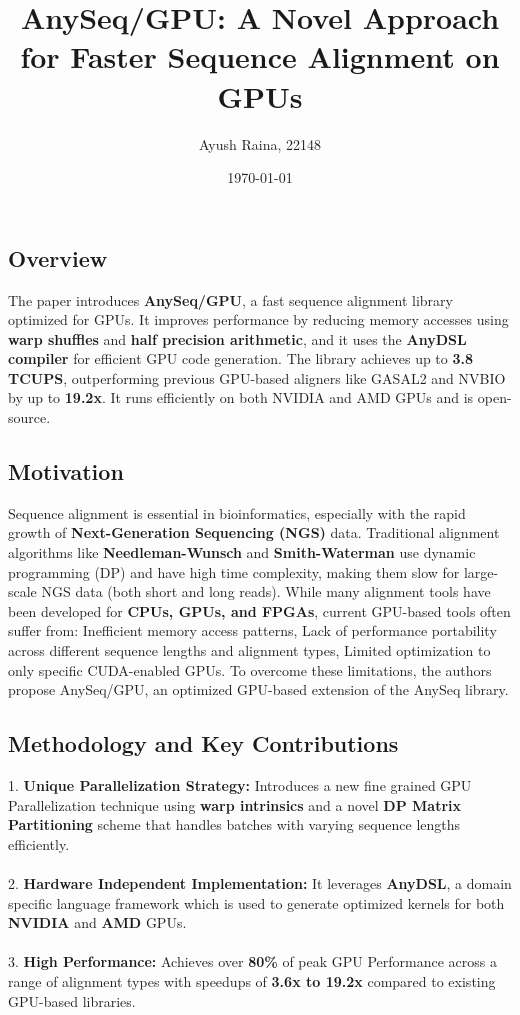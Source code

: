\documentclass{article}
\title{AnySeq/GPU: A Novel Approach for Faster Sequence Alignment on GPUs}
\author{Ayush Raina, 22148}
\date{\today}
\begin{document}
 

\maketitle

\subsection*{Overview}
The paper introduces \textbf{AnySeq/GPU}, a fast sequence alignment library optimized for GPUs. It improves performance by reducing memory accesses using \textbf{warp shuffles} and \textbf{half precision arithmetic}, and it uses the \textbf{AnyDSL compiler} for efficient GPU code generation. The library achieves up to \textbf{3.8 TCUPS}, outperforming previous GPU-based aligners like GASAL2 and NVBIO by up to \textbf{19.2x}. It runs efficiently on both NVIDIA and AMD GPUs and is open-source.

\subsection*{Motivation}
Sequence alignment is essential in bioinformatics, especially with the rapid growth of \textbf{Next-Generation Sequencing (NGS)} data. Traditional alignment algorithms like \textbf{Needleman-Wunsch} and \textbf{Smith-Waterman} use dynamic programming (DP) and have high time complexity, making them slow for large-scale NGS data (both short and long reads). While many alignment tools have been developed for \textbf{CPUs, GPUs, and FPGAs}, current GPU-based tools often suffer from:
    Inefficient memory access patterns,
    Lack of performance portability across different sequence lengths and alignment types,
    Limited optimization to only specific CUDA-enabled GPUs.
To overcome these limitations, the authors propose AnySeq/GPU, an optimized GPU-based extension of the AnySeq library.

\subsection*{Methodology and Key Contributions}
1. \textbf{Unique Parallelization Strategy: }Introduces a new fine grained GPU Parallelization technique using \textbf{warp intrinsics} and a novel \textbf{DP Matrix Partitioning} scheme that handles batches with varying sequence lengths efficiently. \\ \\ 
2. \textbf{Hardware Independent Implementation: }It leverages \textbf{AnyDSL}, a domain specific language framework which is used to generate optimized kernels for both \textbf{NVIDIA} and \textbf{AMD} GPUs. \\ \\ 
3. \textbf{High Performance: }Achieves over \textbf{80\%} of peak GPU Performance across a range of alignment types with speedups of \textbf{3.6x to 19.2x} compared to existing GPU-based libraries.
\end{document}

